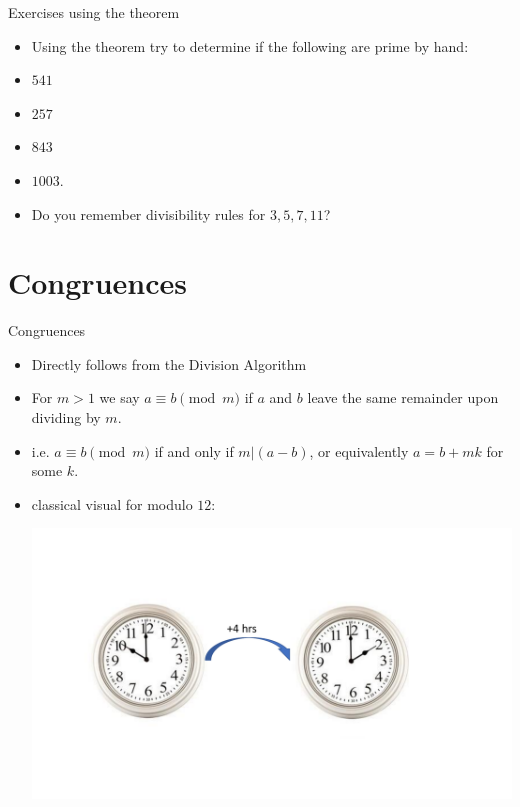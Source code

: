 \documentclass[ %
 usenames,dvipsnames,
aspectratio=169,11pt ]{beamer}
\newenvironment{stepitemize}{\begin{itemize}[<+->]}{\end{itemize} }
\begin{document}
\begin{frame}{Exercises using the theorem}
\begin{stepitemize}
\item Using the theorem try to determine if the following are prime by hand:
\item $541$
\item $257$
\item $843$
\item $1003$.
\item Do you remember divisibility rules for $3,5,7,11$?
\end{stepitemize}

\end{frame}

\section{Congruences}
\begin{frame}{Congruences}
\begin{stepitemize}
\item Directly follows from the Division Algorithm
\item For $m>1$ we say $a\equiv b \pmod{m}$ if $a$ and $b$ leave the same remainder upon dividing by $m$.
\item i.e. $a\equiv b \pmod{m}$ if and only if $m|(a-b)$, or equivalently $a=b+mk$ for some $k$.
\item classical visual for modulo $12$:
    \begin{center}
    \includegraphics[scale=.35]{clock1.pdf}
\end{center}

\end{stepitemize}
\end{frame}
\end{document}
